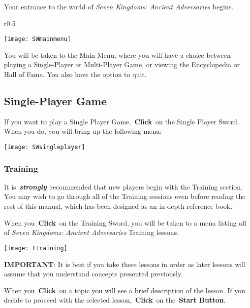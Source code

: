 Your entrance to the world of \textit{Seven Kingdoms: Ancient Adversaries} begins.

\begin{wrapfigure}{r}{0.5\textwidth}
	\begin{center}
		\vspace{-20pt}
		\texttt{[image: SWmainmenu]}
	\end{center}
	\vspace{-20pt}
\end{wrapfigure}

You will be taken to the Main Menu, where you will have a choice between playing a Single-Player or Multi-Player Game, or viewing the Encyclopedia or Hall of Fame. You also have the option to quit.

\subsection{Single-Player Game}


If you want to play a Single Player Game, \textbf{Click} on the Single Player Sword. When you do, you will bring up the following menu: 

\begin{center}
\texttt{[image: SWsingleplayer]}
\end{center}

\subsubsection{Training}

It is \textbf{\textit{strongly}} recommended that new players begin with the Training section. You may wish to go through all of the Training sessions even before reading the rest of this manual, which has been designed as an in-depth reference book.

When you \textbf{Click} on the Training Sword, you will be taken to a menu listing all of \textit{Seven Kingdoms: Ancient Adversaries} Training lessons.

\begin{center}
\texttt{[image: Itraining]}
\end{center}

\textbf{IMPORTANT}: It is best if you take these lessons in order as later lessons will assume that you understand concepts presented previously.

When you \textbf{Click} on a topic you will see a brief description of the lesson. If you decide to proceed with the selected lesson, \textbf{Click} on the \textbf{Start Button}.

